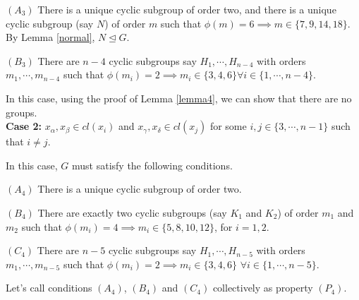 \documentclass[a4paper,11pt]{amsart}
\numberwithin{equation}{section}
\numberwithin{equation}{subsection}
\begin{document}
$(A_3)$ There is a unique cyclic subgroup of order two, and there is a unique cyclic subgroup (say $N$) of order $m$ such that $\phi(m) = 6 \implies m\in \{7,9,14,18\}$. By Lemma \ref{normal}, $N\trianglelefteq G$.

$(B_3)$ There are $n-4$ cyclic subgroups say $H_1,\cdots,H_{n-4}$ with orders $m_1,\cdots,m_{n-4}$ such that $\phi(m_i) = 2\implies m_i\in \{3,4,6\} \forall i\in \{1,\cdots,n-4\}$.


In this case, using the proof of Lemma \ref{lemma4}, we can show that there are no groups.\\ 

 \textbf{Case 2:} $x_{\alpha},x_{\beta}\in cl(x_i)$ and $ x_{\gamma},x_{\delta} \in cl(x_{j})$ for some $i,j\in\{3,\cdots,n-1\}$ such that $i\neq j$.


  In this case, $G$ must satisfy the following  conditions.

$(A_4)$ There is a unique cyclic subgroup of order two.

$(B_4)$ There are exactly two cyclic subgroups (say $K_1$ and $K_2$) of order $m_1$ and $m_2$
such that $\phi(m_i) = 4 \implies m_i\in \{5,8,10,12\}$, for $i=1,2$.

$(C_4)$ There are $n-5$ cyclic subgroups say $H_1,\cdots,H_{n-5}$ with orders $m_1,\cdots,m_{n-5}$ 
such that $\phi(m_i) = 2\implies m_i\in \{3,4,6\} $ $\forall i\in \{1,\cdots,n-5\}$.

 Let's call conditions $(A_4)$, $(B_4)$ and $(C_4)$ collectively as property $(P_4)$.
\end{document}
